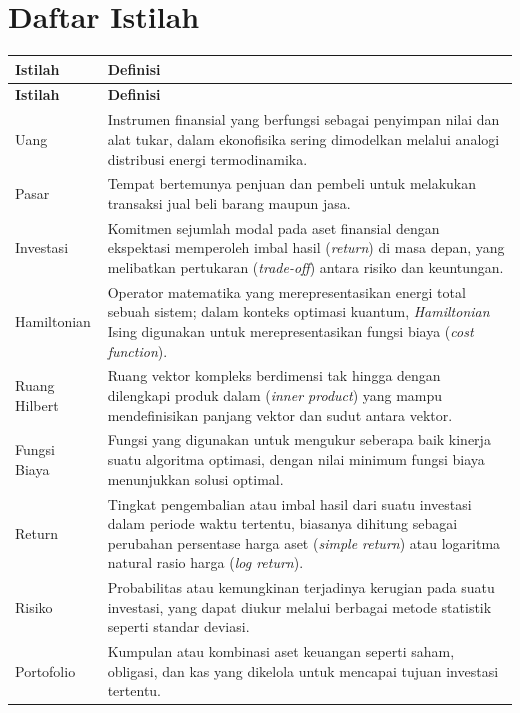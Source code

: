 \cleardoublepage
{}
{}
\chapter*{Daftar Istilah}

\begin{longtable}{|p{3.5cm}|p{10.5cm}|}
\hline
\textbf{Istilah} & \textbf{Definisi} \\ \hline
\endfirsthead
\hline
\textbf{Istilah} & \textbf{Definisi} \\ \hline
\endhead
\hline
\endfoot
\hline
\endlastfoot
Uang & Instrumen finansial yang berfungsi sebagai penyimpan nilai dan alat tukar, dalam ekonofisika sering dimodelkan melalui analogi distribusi energi termodinamika. \\ \hline
Pasar & Tempat bertemunya penjuan dan pembeli untuk melakukan transaksi jual beli barang maupun jasa. \\ \hline
Investasi & Komitmen sejumlah modal pada aset finansial dengan ekspektasi memperoleh imbal hasil (\textit{return}) di masa depan, yang melibatkan pertukaran (\textit{trade-off}) antara risiko dan keuntungan. \\ \hline
Hamiltonian & Operator matematika yang merepresentasikan energi total sebuah sistem; dalam konteks optimasi kuantum, \textit{Hamiltonian} Ising digunakan untuk merepresentasikan fungsi biaya (\textit{cost function}). \\ \hline
Ruang Hilbert & Ruang vektor kompleks berdimensi tak hingga dengan dilengkapi produk dalam (\textit{inner product}) yang mampu mendefinisikan panjang vektor dan sudut antara vektor. \\ \hline
Fungsi Biaya & Fungsi yang digunakan untuk mengukur seberapa baik kinerja suatu algoritma optimasi, dengan nilai minimum fungsi biaya menunjukkan solusi optimal. \\ \hline
Return & Tingkat pengembalian atau imbal hasil dari suatu investasi dalam periode waktu tertentu, biasanya dihitung sebagai perubahan persentase harga aset (\textit{simple return}) atau logaritma natural rasio harga (\textit{log return}). \\ \hline
Risiko & Probabilitas atau kemungkinan terjadinya kerugian pada suatu investasi, yang dapat diukur melalui berbagai metode statistik seperti standar deviasi. \\ \hline
Portofolio & Kumpulan atau kombinasi aset keuangan seperti saham, obligasi, dan kas yang dikelola untuk mencapai tujuan investasi tertentu. \\ \hline

\end{longtable}
